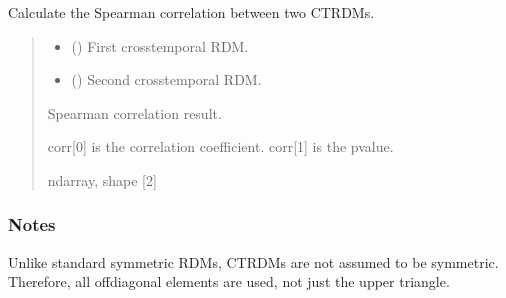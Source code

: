 \documentclass[letterpaper,10pt,english]{sphinxhowto}
\begin{document}
\begin{fulllineitems}
\label{\detokenize{ctrdm_corr:neurora.ctrdm_corr.ctrdm_correlation_spearman}}
\pysigstartsignatures
{}
\pysigstopsignatures
\sphinxAtStartPar
Calculate the Spearman correlation between two CTRDMs.
\begin{quote}\begin{description}
\begin{itemize}
\item {} 
\sphinxAtStartPar
{} (\sphinxstyleliteralemphasis{\sphinxupquote{, }}\sphinxstyleliteralemphasis{\sphinxupquote{ {[}}}\sphinxstyleliteralemphasis{\sphinxupquote{, }}\sphinxstyleliteralemphasis{\sphinxupquote{{]}}}) \textendash{} First cross\sphinxhyphen{}temporal RDM.

\item {} 
\sphinxAtStartPar
{} (\sphinxstyleliteralemphasis{\sphinxupquote{, }}\sphinxstyleliteralemphasis{\sphinxupquote{ {[}}}\sphinxstyleliteralemphasis{\sphinxupquote{, }}\sphinxstyleliteralemphasis{\sphinxupquote{{]}}}) \textendash{} Second cross\sphinxhyphen{}temporal RDM.

\end{itemize}

\sphinxAtStartPar

\sphinxAtStartPar
{} \textendash{} Spearman correlation result.

\sphinxAtStartPar
corr{[}0{]} is the correlation coefficient.
corr{[}1{]} is the p\sphinxhyphen{}value.


\sphinxAtStartPar
ndarray, shape {[}2{]}

\end{description}\end{quote}
\subsubsection*{Notes}

\sphinxAtStartPar
Unlike standard symmetric RDMs, CTRDMs are not assumed to be symmetric.
Therefore, all off\sphinxhyphen{}diagonal elements are used, not just the upper triangle.

\end{fulllineitems}
\end{document}
